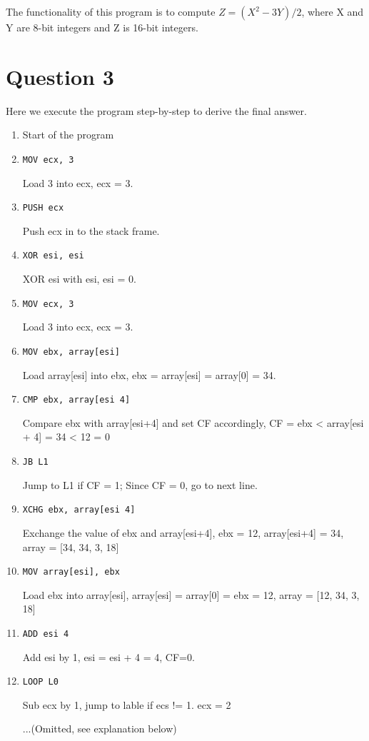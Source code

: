 \documentclass[11pt]{article}
\begin{document}
The functionality of this program is to compute $Z = (X^2 - 3Y) / 2$, where X and Y are 8-bit integers and Z is 16-bit integers. 

\section{Question 3}

Here we execute the program step-by-step to derive the final answer.
\begin{enumerate}
    \item Start of the program \par
    \item \lstinline{MOV ecx, 3}\par 
    Load 3 into ecx, ecx = 3.
    \item \lstinline{PUSH ecx} \par
    Push ecx in to the stack frame.
    \item \lstinline{XOR esi, esi} \par
    XOR esi with esi, esi = 0.
    \item \lstinline{MOV ecx, 3}\par 
    Load 3 into ecx, ecx = 3.
    \item \lstinline{MOV ebx, array[esi]}\par
    Load array[esi] into ebx, ebx = array[esi] = array[0] = 34.
    \item \lstinline{CMP ebx, array[esi 4]}\par
    Compare ebx with array[esi+4] and set CF accordingly, CF = ebx < array[esi + 4] = 34 < 12 = 0
    \item \lstinline{JB L1}\par
    Jump to L1 if CF = 1; Since CF = 0, go to next line.
    \item \lstinline{XCHG ebx, array[esi 4]}\par
    Exchange the value of ebx and array[esi+4], ebx = 12, array[esi+4] = 34, array = [34, 34, 3, 18]
    \item \lstinline{MOV array[esi], ebx}\par
    Load ebx into array[esi], array[esi] = array[0] = ebx = 12, array = [12, 34, 3, 18]
    \item \lstinline{ADD esi 4}\par
    Add esi by 1, esi = esi + 4 = 4, CF=0.
    \item \lstinline{LOOP L0}\par
    Sub ecx by 1, jump to lable if ecs != 1. ecx = 2\par
    ...(Omitted, see explanation below)
\end{enumerate}
\end{document}
